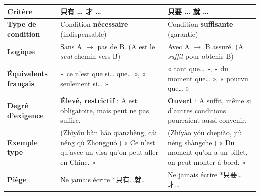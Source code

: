 \documentclass[11pt]{article}
\newcommand{\zh}[1]{\ifmmode\text{#1}\else{#1}\fi}
\begin{document}
\begin{center}
\begin{tabularx}{\linewidth}{|X|X|X|}
\hline
\rowcolor{popblueL}
\textbf{Critère} & \textbf{只有 … 才 …} & \textbf{只要 … 就 …} \\ \hline
\textbf{Type de condition} & Condition \textbf{nécessaire} (indispensable) & Condition \textbf{suffisante} (garantie) \\ \hline
\textbf{Logique} & Sans A $\rightarrow$ pas de B. \newline (A est le \emph{seul} chemin vers B) & Avec A $\rightarrow$ B assuré. \newline (A \emph{suffit} pour obtenir B) \\ \hline
\textbf{Équivalents français} & « ce n'est que si… que… », « seulement si… » & « tant que… », « du moment que… », « pourvu que… » \\ \hline
\textbf{Degré d'exigence} & \textbf{Élevé, restrictif} : A est obligatoire, mais peut ne pas suffire. & \textbf{Ouvert} : A suffit, même si d'autres conditions pourraient aussi convenir. \\ \hline
\textbf{Exemple type} & \zh{只有办好签证，才能去中国。} \newline (Zhǐyǒu bàn hǎo qiānzhèng, cái néng qù Zhōngguó.) \newline « Ce n'est qu'avec un visa qu'on peut aller en Chine. » & \zh{只要有车票，就能上车。} \newline (Zhǐyào yǒu chēpiào, jiù néng shàngchē.) \newline « Du moment qu'on a un billet, on peut monter à bord. » \\ \hline
\textbf{Piège} & Ne jamais écrire *只有…就… & Ne jamais écrire *只要…才… \\ \hline
\end{tabularx}
\end{center}
\end{document}
